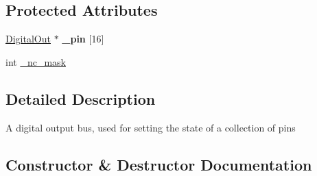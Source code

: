 \subsection*{Protected Attributes}
\begin{DoxyCompactItemize}
\item 
\hyperlink{classmbed_1_1_digital_out}{Digital\+Out} $\ast$ {\bfseries \+\_\+pin} \mbox{[}16\mbox{]}\hypertarget{classmbed_1_1_bus_out_aebb26dee44094ccbea4a66351bad1a9d}{}\label{classmbed_1_1_bus_out_aebb26dee44094ccbea4a66351bad1a9d}

\item 
int \hyperlink{classmbed_1_1_bus_out_ad044deaa2ea58e94340ee7d2c5b5779a}{\+\_\+nc\+\_\+mask}
\end{DoxyCompactItemize}


\subsection{Detailed Description}
A digital output bus, used for setting the state of a collection of pins 

\subsection{Constructor \& Destructor Documentation}

